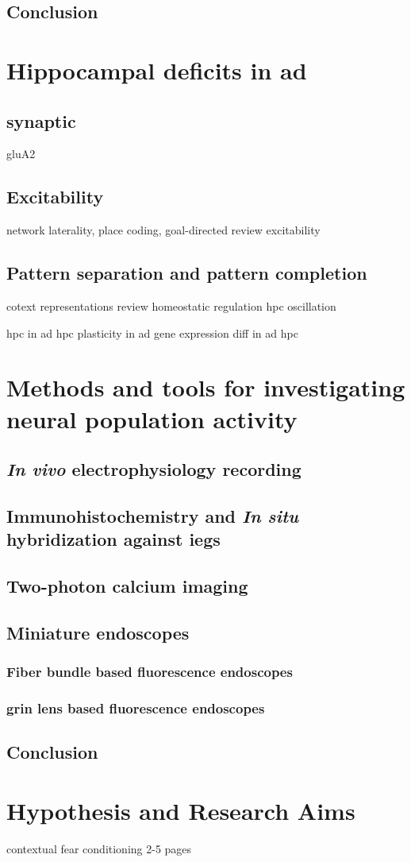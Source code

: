 \subsection{Conclusion}


\section{Hippocampal deficits in \gls{ad}}
\subsection{synaptic}
gluA2
\subsection{Excitability}
    network laterality, place coding, goal-directed review\citep{kitanishi16}
    \citep{oh14} excitability
\subsection{Pattern separation and pattern completion}
    \citep{smith14} cotext representations review
    homeostatic regulation \citep{mizumori13}
    \citep{draguhn14} hpc oscillation


\citep{moodley14} hpc in \gls{ad}
\citep{mufson15} hpc plasticity in \gls{ad}
\citep{saura15} gene expression diff in \gls{ad} hpc

\section{Methods and tools for investigating neural population activity}
\subsection{\textit{In vivo} electrophysiology recording}
\subsection{Immunohistochemistry and \textit{In situ} hybridization against \glspl{ieg}}
\subsection{Two-photon calcium imaging}
\subsection{Miniature endoscopes}
\subsubsection{Fiber bundle based fluorescence endoscopes}
\subsubsection{\gls{grin} lens based fluorescence endoscopes}
\subsection{Conclusion}


\section{Hypothesis and Research Aims}
\citep{rozeske14} contextual fear conditioning
2-5 pages
